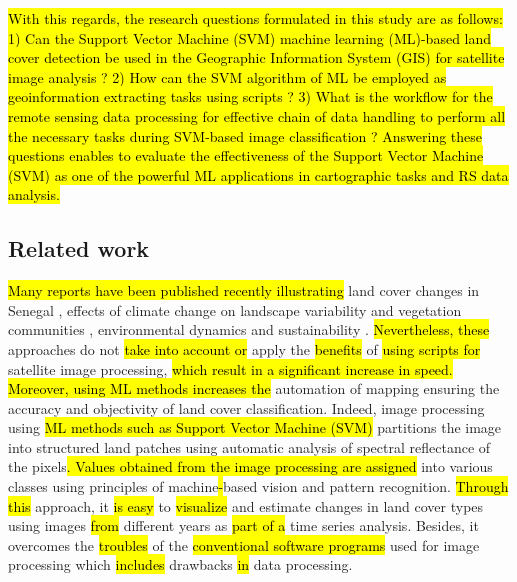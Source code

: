 \documentclass[earth,article,submit,pdftex,moreauthors]{Definitions/mdpi}
\begin{document}
\hl{With this regards, the research questions formulated in this study are as follows: 1) Can the Support Vector Machine (SVM) machine learning (ML)-based land cover detection be used in the Geographic Information System (GIS) for satellite image analysis ? 2) How can the SVM algorithm of ML be employed as geoinformation extracting tasks using scripts ? 3) What is the workflow for the remote sensing data processing for effective chain of data handling to perform all the necessary tasks during SVM-based image classification ? Answering these questions enables to evaluate the effectiveness of the Support Vector Machine (SVM) as one of the powerful ML applications in cartographic tasks and RS data analysis.}

\subsection{Related work}

\hl{Many reports have been published recently illustrating} land cover changes in Senegal \cite{WOOD2004565,ELBERLING200337,Hiraldo}, effects of climate change on landscape variability and vegetation communities \cite{LIU2004583,TSCHAKERT2004535,LUFAFA20081}, environmental dynamics and sustainability \cite{CAMARA2017204}. \hl{Nevertheless, these} approaches do not \hl{take into account or} apply the \hl{benefits} of \hl{using scripts for} satellite image processing, \hl{which result in a significant increase in speed. Moreover, using ML methods increases the} automation of mapping ensuring the accuracy and objectivity of land cover classification. Indeed, image processing using \hl{ML methods such as Support Vector Machine (SVM) }partitions the image into structured land patches using automatic analysis of spectral reflectance of the pixels\hl{. Values obtained from the image processing are assigned }into various classes using principles of machine\hl{-}based vision and pattern recognition. \hl{Through this} approach, it \hl{is easy} to \hl{visualize} and estimate changes in land cover types using images \hl{from} different years as \hl{part of a} time series analysis. Besides, it overcomes the \hl{troubles} of the \hl{conventional software programs} used for image processing which \hl{includes} drawbacks \hl{in} data processing.
\end{document}
